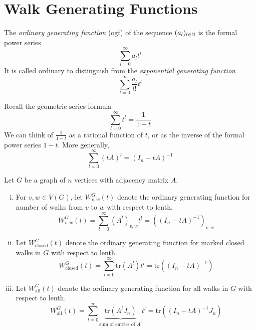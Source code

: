 \section[Generating Functions]{Walk Generating Functions}
\begin{definition}
The \emph{ordinary generating function} (ogf) of the sequence \((a_l)_{l\in\mathbb{N}}\) is the formal power series
\[ \sum_{l=0}^\infty a_l t^l \]
It is called ordinary to distinguish from the \emph{exponential generating function}
\[ \sum_{l=0}^\infty \frac{a_l}{l!} t^l \]
\end{definition}
Recall the geometric series formula
\[ \sum_{l=0}^\infty t^l=\frac{1}{1-t} \]
We can think of \(\frac{1}{1-t}\) as a rational function of \(t\), or as the inverse of the formal power series \(1-t\).
More generally,
\[ \sum_{l=0}^\infty (tA)^l=(I_n-tA)^{-1} \]


\begin{definition}
Let \(G\) be a graph of \(n\) vertices with adjacency matrix \(A\).
\begin{enumerate}[(i)]
\item For \(v,w\in V(G)\), let \(W_{v,w}^G(t)\) denote the ordinary generating function for number of walks from \(v\) to \(w\) with respect to lenth.
\[ W_{v,w}^G(t)=\sum_{l=0}^\infty (A^l)_{v,w}t^l=\left((I_n-tA)^{-1}\right)_{v,w} \]
\item Let \(W_{\text{closed}}^G(t)\) denote the ordinary generating function for marked closed walks in \(G\) with respect to lenth.
\[ W_{\text{closed}}^G(t)=\sum_{l=0}^\infty \mathrm{tr}(A^l)t^l=\mathrm{tr}\left((I_n-tA)^{-1}\right) \]
\item Let \(W_{\text{all}}^G(t)\) denote the ordinary generating function for all walks in \(G\) with respect to lenth.
\[ W_{\text{all}}^G(t)=\sum_{l=0}^\infty \underbrace{\mathrm{tr}(A^lJ_n)}_{\text{sum of entries of }A^l}t^l=\mathrm{tr}\left((I_n-tA)^{-1}J_n\right) \]
\end{enumerate}
\end{definition}